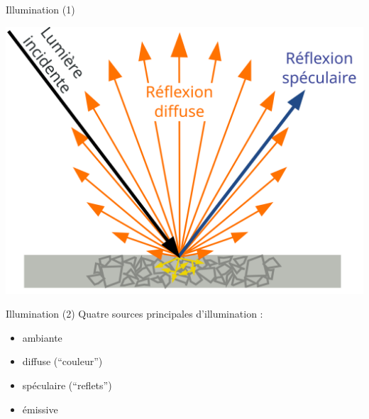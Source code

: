 \documentclass[compress]{beamer}
\begin{document}
\begin{frame}{Illumination (1)}

    \begin{center}
        \includegraphics[width=0.8\linewidth]{diffuse_light}
    \end{center}

\end{frame}

\begin{frame}{Illumination (2)}
    Quatre sources principales d'illumination :

    \begin{itemize}
        \item {\Medium ambiante}
        \item {\Medium diffuse} (``couleur'')
        \item {\Medium spéculaire} (``reflets'')
        \item {\Medium émissive}
    \end{itemize}


\end{frame}
\end{document}
